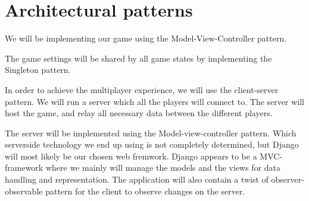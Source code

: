 \section{Architectural patterns}
\label{architecturalpatterns}

We will be implementing our game using the Model-View-Controller pattern.

The game settings will be shared by all game states by implementing the
Singleton pattern.

In order to achieve the multiplayer experience, we will use the client-server
pattern. We will run a server which all the players will connect to. The server
will host the game, and relay all necessary data between the different players.


The server will be implemented using the Model-view-controller pattern. Which
serverside technology we end up using is not completely determined, but Django
will most likely be our chosen web fremwork. Django appears to be a
MVC-framework where we mainly will manage the models and the views for data
handling and representation. The application will also contain a twist of
observer-observable pattern for the client to observe changes on the server.
